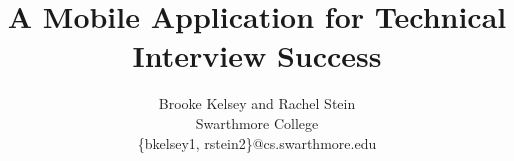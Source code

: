 \documentclass{sig-alternate}
\begin{document}
\date{}

\title{A Mobile Application for Technical Interview Success}

\author{
    Brooke Kelsey and Rachel Stein\\
    Swarthmore College\\
    \{bkelsey1, rstein2\}@cs.swarthmore.edu
}

\maketitle

%


%
%
%
%


\balance
\end{document}
